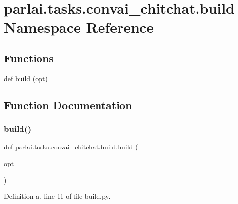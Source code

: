 \hypertarget{namespaceparlai_1_1tasks_1_1convai__chitchat_1_1build}{}\section{parlai.\+tasks.\+convai\+\_\+chitchat.\+build Namespace Reference}
\label{namespaceparlai_1_1tasks_1_1convai__chitchat_1_1build}
\subsection*{Functions}
\begin{DoxyCompactItemize}
\item 
def \hyperlink{namespaceparlai_1_1tasks_1_1convai__chitchat_1_1build_a3c8d628ed6619549434124fc4c755995}{build} (opt)
\end{DoxyCompactItemize}


\subsection{Function Documentation}
\mbox{\label{namespaceparlai_1_1tasks_1_1convai__chitchat_1_1build_a3c8d628ed6619549434124fc4c755995}} 
\subsubsection{\texorpdfstring{build()}{build()}}
{\footnotesize\ttfamily def parlai.\+tasks.\+convai\+\_\+chitchat.\+build.\+build (\begin{DoxyParamCaption}\item[{}]{opt }\end{DoxyParamCaption})}



Definition at line 11 of file build.\+py.

